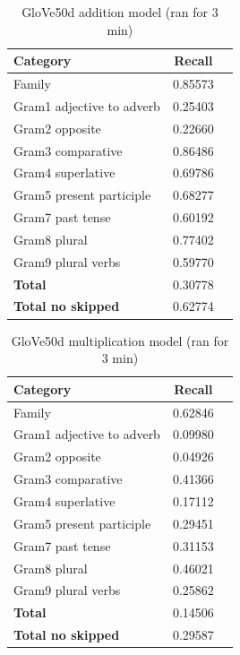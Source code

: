 \begin{center}
	    \begin{table}[h!]
        \begin{tabular}{| l | c | r}
        	\hline
        	\textbf{Category} &    \textbf{Recall}\\ \hline
        	Family 						& 0.85573 \\
        	Gram1 adjective to adverb 	& 0.25403 \\
        	Gram2 opposite 				& 0.22660 \\
        	Gram3 comparative 			& 0.86486 \\
        	Gram4 superlative 			& 0.69786 \\
        	Gram5 present participle	& 0.68277 \\
        	Gram7 past tense 			& 0.60192 \\
        	Gram8 plural 				& 0.77402 \\
        	Gram9 plural verbs 			& 0.59770 \\
        	\textbf{Total}				& 0.30778 \\
        	\textbf{Total no skipped}	& 0.62774 \\ \hline
        \end{tabular}
    \caption{GloVe50d addition model (ran for 3 min)}
    \label{table:glove50d_addition}
    \end{table}
    
    \begin{table}[h!]
        \begin{tabular}{| l | c | r}
        	\hline
        	\textbf{Category} &    \textbf{Recall}\\ \hline
        	Family 						& 0.62846 \\
        	Gram1 adjective to adverb 	& 0.09980 \\
        	Gram2 opposite 				& 0.04926 \\
        	Gram3 comparative 			& 0.41366 \\
        	Gram4 superlative 			& 0.17112 \\
        	Gram5 present participle	& 0.29451 \\
        	Gram7 past tense 			& 0.31153 \\
        	Gram8 plural 				& 0.46021 \\
        	Gram9 plural verbs 			& 0.25862 \\
        	\textbf{Total}				& 0.14506 \\
        	\textbf{Total no skipped}	& 0.29587 \\ \hline
        \end{tabular}
    \caption{GloVe50d multiplication model (ran for 3 min)}
    \label{table:glove50d_addition}
    \end{table}
    

\end{center}
